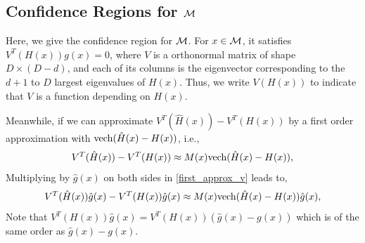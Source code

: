 \documentclass[aos,preprint]{imsart}
\theoremstyle{remark}
\begin{document}
\subsection{Confidence Regions for $\cal M$}
Here, we give the confidence region for $\cal M$. For $x\in\cal M$,  it satisfies $V^T(H(x))g(x) = 0$, where $V$ is a orthonormal matrix of shape $D\times (D-d)$, and each of its columns is the eigenvector corresponding to the $d+1$ to $D$ largest eigenvalues of $H(x)$. Thus, we write $V(H(x))$ to indicate that $V$ is a function depending on $H(x)$.

Meanwhile, if we can approximate $V^T({\hat{H}}(x))- V^T(H(x))$ by a first order approximation with ${\rm vech}(\hat{H}(x)-H(x))$, i.e.,
\begin{equation}\label{first_approx_v}
V^T({\hat{H}}(x))- V^T(H(x))\approx M(x){\rm vech}(\hat{H}(x)-H(x)),
\end{equation}
Multiplying by $\hat{g}(x)$ on both sides in \eqref{first_approx_v} leads to,
\[
V^T({\hat{H}}(x))\hat{g}(x)- V^T(H(x))\hat{g}(x)\approx M(x){\rm vech}(\hat{H}(x)-H(x))\hat{g}(x) ,
\]
Note that $V^T(H(x))\hat{g}(x) = V^T(H(x))(\hat{g}(x) - g(x))$ which is of the same order as $\hat{g}(x) - g(x)$.
\end{document}
